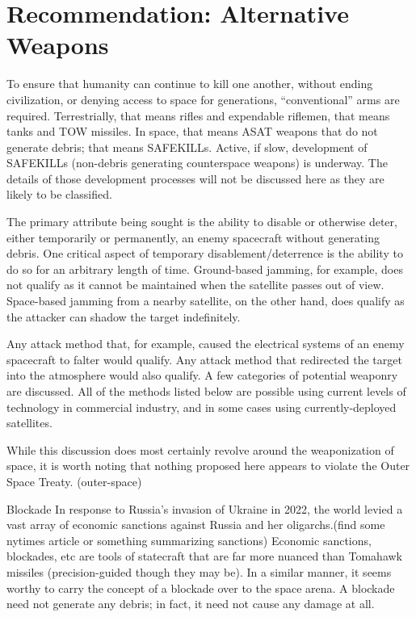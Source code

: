 \section{Recommendation: Alternative Weapons}

To ensure that humanity can continue to kill one another, without
ending civilization, or denying access to space for generations,
``conventional'' arms are required.  Terrestrially, that means rifles
and expendable riflemen, that means tanks and TOW missiles.  In space,
that means ASAT weapons that do not generate debris; that means
SAFEKILLs.  Active, if slow, development of SAFEKILLs (non-debris
generating counterspace weapons) is underway.  The details of those
development processes will not be discussed here as they are likely to
be classified.

The primary attribute being sought is the ability to disable or otherwise deter, either temporarily or permanently, an enemy spacecraft without generating debris.  One critical aspect of temporary disablement/deterrence is the ability to do so for an arbitrary length of time.  Ground-based jamming, for example, does not qualify as it cannot be maintained when the satellite passes out of view.  Space-based jamming from a nearby satellite, on the other hand, does qualify as the attacker can shadow the target indefinitely.

Any attack method that, for example, caused the electrical systems of an enemy spacecraft to falter would qualify.  Any attack method that redirected the target into the atmosphere would also qualify.  A few categories of potential weaponry are discussed.  All of the methods listed below are possible using current levels of technology in commercial industry, and in some cases using currently-deployed satellites.

While this discussion does most certainly revolve around the weaponization of space, it is worth noting that nothing proposed here appears to violate the Outer Space Treaty. (outer-space)

Blockade
In response to Russia's invasion of Ukraine in 2022, the world levied a vast array of economic sanctions against Russia and her oligarchs.(find some nytimes article or something summarizing sanctions)  Economic sanctions, blockades, etc are tools of statecraft that are far more nuanced than Tomahawk missiles (precision-guided though they may be).  In a similar manner, it seems worthy to carry the concept of a blockade over to the space arena.  A blockade need not generate any debris; in fact, it need not cause any damage at all.

